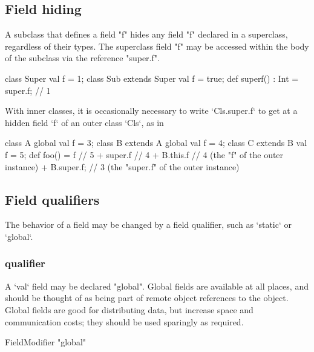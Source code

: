 \subsection{Field hiding}

A subclass that defines a field \xcd"f" hides any field \xcd"f"
declared in a superclass, regardless of their types.  The
superclass field \xcd"f" may be accessed within the body of
the subclass via the reference \xcd"super.f".

\begin{xten}
class Super{ 
  val f = 1; 
}
class Sub extends Super {
  val f = true;
  def superf() : Int = super.f; // 1
}
\end{xten}
%

With inner classes, it is occasionally necessary to 
write \xcd`Cls.super.f` to get at a hidden field \xcd`f` of an outer class
\xcd`Cls`, as in 
\begin{xten}
class A {
   global val f = 3;
}
class B extends A {
   global val f = 4;
   class C extends B {
      val f = 5;
      def foo()
         = f          // 5
         + super.f    // 4
         + B.this.f   // 4 (the "f" of the outer instance)
         + B.super.f; // 3 (the "super.f" of the outer instance)
    }
}
\end{xten}
%


\subsection{Field qualifiers}
\label{FieldQualifier}

The behavior of a field may be changed by a field qualifier, such as
\xcd`static` or \xcd`global`.  

\subsubsection{ qualifier}
\label{GlobalField}

A \xcd`val` field may be declared \xcd"global". Global fields are available at
all places, and should be thought of as being part of remote object references
to the object. Global fields are good for distributing data, but increase
space and communication costs; they should be used sparingly as required.

\begin{grammar}
  FieldModifier \: \xcd"global"  
\end{grammar}

